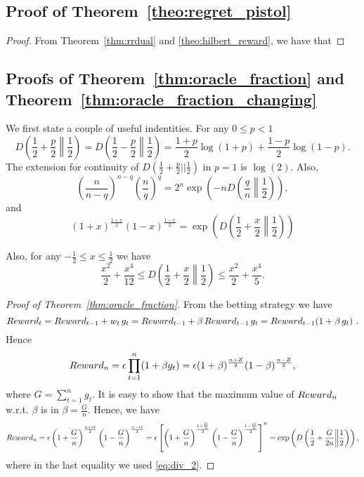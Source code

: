 \subsection{Proof of Theorem~\ref{theo:regret_pistol}}
\begin{proof}
From Theorem~\ref{thm:rrdual} and \ref{theo:hilbert_reward}, we have that
\end{proof}


\subsection{Proofs of Theorem~\ref{thm:oracle_fraction} and Theorem~\ref{thm:oracle_fraction_changing}}

We first state a couple of useful indentities.
For any $ 0\leq p < 1$
\[
D\left(\frac{1}{2}+\frac{p}{2}\middle\|\frac{1}{2}\right) = D\left(\frac{1}{2}-\frac{p}{2}\middle\|\frac{1}{2}\right)= \frac{1+p}{2} \log(1+p) + \frac{1-p}{2} \log(1-p).
\]
The extension for continuity of $D(\frac{1}{2}+\frac{p}{2}||\frac{1}{2})$ in $p=1$ is $\log(2)$.
Also,
\[
\left(\frac{n}{n-q}\right)^{n-q} \left(\frac{n}{q}\right)^{q} = 2^n \exp\left(-n D\left(\frac{q}{n}\middle\|\frac{1}{2}\right)\right),
\]
and
\begin{equation}
\label{eq:div_2}
\left(1+x\right)^\frac{1+x}{2} \left(1-x\right)^\frac{1-x}{2}= \exp\left( D\left(\frac{1}{2}+\frac{x}{2}\middle\|\frac{1}{2}\right) \right)
\end{equation}

Also, for any $-\frac{1}{2} \leq x\leq \frac{1}{2}$ we have
\[
\frac{x^2}{2} +\frac{x^4}{12}\leq D\left(\frac{1}{2}+\frac{x}{2}\middle\|\frac{1}{2}\right) \leq \frac{x^2}{2} + \frac{x^4}{5}.
\]

\begin{proof}[Proof of Theorem~\ref{thm:oracle_fraction}]
From the betting strategy we have
\[
Reward_t=Reward_{t-1} + w_t \, g_t = Reward_{t-1} + \beta \, Reward_{t-1} \, g_t = Reward_{t-1} (1+\beta \, g_t)~.
\]
Hence
\[
Reward_n=\epsilon \prod_{t=1}^n (1+\beta g_t) = \epsilon (1+\beta)^\frac{n+Z}{2} (1-\beta)^\frac{n-Z}{2},
\]
where $G=\sum_{t=1}^n g_t$.
It is easy to show that the maximum value of $Reward_n$ w.r.t. $\beta$ is in $\beta=\frac{G}{n}$. 
Hence, we have
\[
Reward_n = \epsilon \left(1+\frac{G}{n}\right)^\frac{n+G}{2} \left(1-\frac{G}{n}\right)^\frac{n-G}{2} 
= \epsilon \left[\left(1+\frac{G}{n}\right)^\frac{1+\frac{G}{n}}{2} \left(1-\frac{G}{n}\right)^\frac{1-\frac{G}{n}}{2}\right]^n = \exp\left( D\left(\frac{1}{2}+\frac{G}{2n}\middle\|\frac{1}{2}\right) \right),
\]
where in the last equality we used \eqref{eq:div_2}.
\end{proof}

